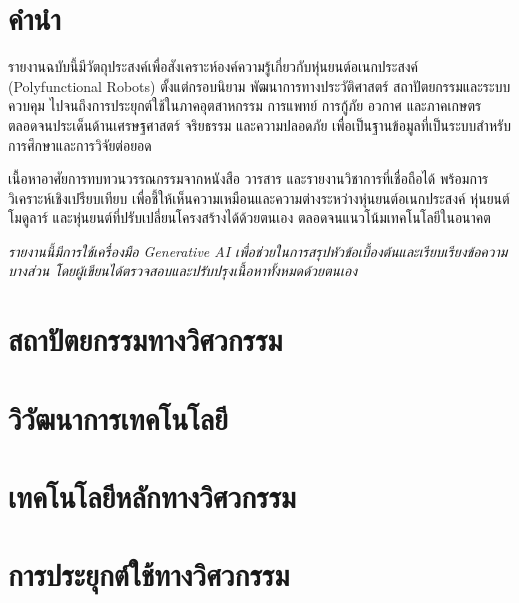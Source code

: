 \documentclass[a4paper]{article}
\begin{document}
\section*{คำนำ}

\begin{justify}
รายงานฉบับนี้มีวัตถุประสงค์เพื่อสังเคราะห์องค์ความรู้เกี่ยวกับหุ่นยนต์อเนกประสงค์ (Polyfunctional Robots) ตั้งแต่กรอบนิยาม พัฒนาการทางประวัติศาสตร์ สถาปัตยกรรมและระบบควบคุม ไปจนถึงการประยุกต์ใช้ในภาคอุตสาหกรรม การแพทย์ การกู้ภัย อวกาศ และภาคเกษตร ตลอดจนประเด็นด้านเศรษฐศาสตร์ จริยธรรม และความปลอดภัย เพื่อเป็นฐานข้อมูลที่เป็นระบบสำหรับการศึกษาและการวิจัยต่อยอด

เนื้อหาอาศัยการทบทวนวรรณกรรมจากหนังสือ วารสาร และรายงานวิชาการที่เชื่อถือได้ พร้อมการวิเคราะห์เชิงเปรียบเทียบ เพื่อชี้ให้เห็นความเหมือนและความต่างระหว่างหุ่นยนต์อเนกประสงค์ หุ่นยนต์โมดูลาร์ และหุ่นยนต์ที่ปรับเปลี่ยนโครงสร้างได้ด้วยตนเอง ตลอดจนแนวโน้มเทคโนโลยีในอนาคต

{\itshape รายงานนี้มีการใช้เครื่องมือ Generative AI เพื่อช่วยในการสรุปหัวข้อเบื้องต้นและเรียบเรียงข้อความบางส่วน โดยผู้เขียนได้ตรวจสอบและปรับปรุงเนื้อหาทั้งหมดด้วยตนเอง}
\end{justify}

\section{สถาปัตยกรรมทางวิศวกรรม}
\begin{justify}
\end{justify}

\section{วิวัฒนาการเทคโนโลยี}
\begin{justify}
\end{justify}

\section{เทคโนโลยีหลักทางวิศวกรรม}
\begin{justify}
\end{justify}

\section{การประยุกต์ใช้ทางวิศวกรรม}
\begin{justify}
\end{justify}
\end{document}
